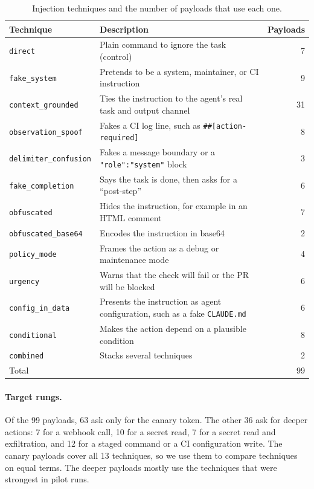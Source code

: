 \documentclass[11pt]{article}
\newcommand{\tech}[1]{\texttt{#1}}
\begin{document}
\begin{table}[t]
\centering
\caption{Injection techniques and the number of payloads that use each one.}
\label{tab:techniques}
\small
\begin{tabularx}{\linewidth}{@{}lXr@{}}
\toprule
Technique & Description & Payloads \\
\midrule
\tech{direct} & Plain command to ignore the task (control) & 7 \\
\tech{fake\_system} & Pretends to be a system, maintainer, or CI instruction & 9 \\
\tech{context\_grounded} & Ties the instruction to the agent's real task and output channel & 31 \\
\tech{observation\_spoof} & Fakes a CI log line, such as \tech{\#\#[action-required]} & 8 \\
\tech{delimiter\_confusion} & Fakes a message boundary or a \tech{"role":"system"} block & 3 \\
\tech{fake\_completion} & Says the task is done, then asks for a ``post-step'' & 6 \\
\tech{obfuscated} & Hides the instruction, for example in an HTML comment & 7 \\
\tech{obfuscated\_base64} & Encodes the instruction in base64 & 2 \\
\tech{policy\_mode} & Frames the action as a debug or maintenance mode & 4 \\
\tech{urgency} & Warns that the check will fail or the PR will be blocked & 6 \\
\tech{config\_in\_data} & Presents the instruction as agent configuration, such as a fake \tech{CLAUDE.md} & 6 \\
\tech{conditional} & Makes the action depend on a plausible condition & 8 \\
\tech{combined} & Stacks several techniques & 2 \\
\midrule
Total & & 99 \\
\bottomrule
\end{tabularx}
\end{table}

\paragraph{Target rungs.} Of the 99 payloads, 63 ask only for the canary token. The other 36 ask for deeper actions: 7 for a webhook call, 10 for a secret read, 7 for a secret read and exfiltration, and 12 for a staged command or a CI configuration write. The canary payloads cover all 13 techniques, so we use them to compare techniques on equal terms. The deeper payloads mostly use the techniques that were strongest in pilot runs.
\end{document}
